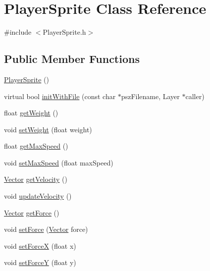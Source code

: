 \hypertarget{class_player_sprite}{\section{\-Player\-Sprite \-Class \-Reference}
\label{class_player_sprite}
}


{\ttfamily \#include $<$\-Player\-Sprite.\-h$>$}

\subsection*{\-Public \-Member \-Functions}
\begin{DoxyCompactItemize}
\item 
\hyperlink{class_player_sprite_a355b762b077d780021af012027c1aff1}{\-Player\-Sprite} ()
\item 
virtual bool \hyperlink{class_player_sprite_a44a399fb158ef7a3637d0780f629a035}{init\-With\-File} (const char $\ast$psz\-Filename, \-Layer $\ast$caller)
\item 
float \hyperlink{class_player_sprite_aad883076d38aa90cb76fb85e5d84b42b}{get\-Weight} ()
\item 
void \hyperlink{class_player_sprite_a421ad1ab42de6fad573430640d05b5ea}{set\-Weight} (float weight)
\item 
float \hyperlink{class_player_sprite_ae322a0adbdbc74ddca22e7deb1db9f46}{get\-Max\-Speed} ()
\item 
void \hyperlink{class_player_sprite_a5b6dd058c35ba9bd422c0721f00f5b89}{set\-Max\-Speed} (float max\-Speed)
\item 
\hyperlink{struct_vector}{\-Vector} \hyperlink{class_player_sprite_a3376b1419374cbdbb7b1bf1605bc8eb0}{get\-Velocity} ()
\item 
void \hyperlink{class_player_sprite_a3c28e6d11a08724aef010bf9bf09a5a4}{update\-Velocity} ()
\item 
\hyperlink{struct_vector}{\-Vector} \hyperlink{class_player_sprite_a261319de832d01b1e64601887cbf2a2c}{get\-Force} ()
\item 
void \hyperlink{class_player_sprite_a376df965770e619cee7c02f56355c8cb}{set\-Force} (\hyperlink{struct_vector}{\-Vector} force)
\item 
void \hyperlink{class_player_sprite_a856c0c8d593bbb855aa2a979286f8ea6}{set\-Force\-X} (float x)
\item 
void \hyperlink{class_player_sprite_a5e8593fec3114f426b4346bbf8a12379}{set\-Force\-Y} (float y)
\item 

\end{DoxyCompactItemize}
